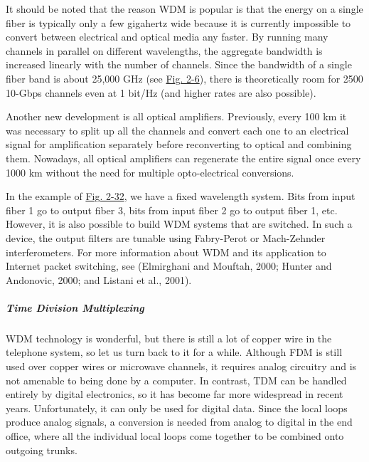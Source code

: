 \documentclass[b5paper,11pt]{memoir}
\begin{document}
It should be noted that the reason WDM is popular is that the energy on
a single fiber is typically only a few gigahertz wide because it is
currently impossible to convert between electrical and optical media any
faster. By running many channels in parallel on different wavelengths,
the aggregate bandwidth is increased linearly with the number of
channels. Since the bandwidth of a single fiber band is about 25,000 GHz
(see
\protect\hyperlink{0130661023_ch02lev1sec2.htmlux5cux23ch02fig06}{Fig.
2-6}), there is theoretically room for 2500 10-Gbps channels even at 1
bit/Hz (and higher rates are also possible).

Another new development is all optical amplifiers. Previously, every 100
km it was necessary to split up all the channels and convert each one to
an electrical signal for amplification separately before reconverting to
optical and combining them. Nowadays, all optical amplifiers can
regenerate the entire signal once every 1000 km without the need for
multiple opto-electrical conversions.

In the example of
\protect\hyperlink{0130661023_ch02lev1sec5.htmlux5cux23ch02fig32}{Fig.
2-32}, we have a fixed wavelength system. Bits from input fiber 1 go to
output fiber 3, bits from input fiber 2 go to output fiber 1, etc.
However, it is also possible to build WDM systems that are switched. In
such a device, the output filters are tunable using Fabry-Perot or
Mach-Zehnder interferometers. For more information about WDM and its
application to Internet packet switching, see (Elmirghani and Mouftah,
2000; Hunter and Andonovic, 2000; and Listani et al., 2001).

\protect\hypertarget{0130661023_ch02lev1sec5.htmlux5cux23ch02lev3sec14}{}{}

\subparagraph{Time Division Multiplexing}

WDM technology is wonderful, but there is still a lot of copper wire in
the telephone system, so let us turn back to it for a while. Although
FDM is still used over copper wires or microwave channels, it requires
analog circuitry and is not amenable to being done by a computer. In
contrast, TDM can be handled entirely by digital electronics, so it has
become far more widespread in recent years. Unfortunately, it can only
be used for digital data. Since the local loops produce analog signals,
a conversion is needed from analog to digital in the end office, where
all the individual local loops come together to be combined onto
outgoing trunks.
\end{document}
